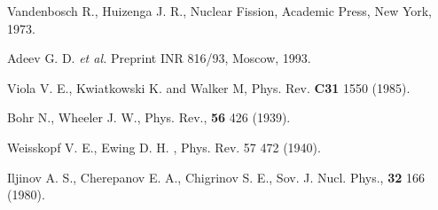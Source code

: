 \begin{thebibliography}{599}

 Vandenbosch R., Huizenga J. R., Nuclear Fission, Academic 
Press, New York, 1973.

 Adeev G. D. {\it et al.} Preprint INR 816/93, Moscow, 1993.

 Viola V. E., Kwiatkowski K. and Walker M, Phys. Rev. 
{\bf C31} 1550 (1985).

 Bohr N., Wheeler J. W., Phys. Rev., {\bf 56} 426 (1939).

 Weisskopf V. E., Ewing D. H. , Phys. Rev. {57} 472 (1940).

 Iljinov A. S., Cherepanov E. A., Chigrinov S. E.,
Sov. J. Nucl. Phys., {\bf 32} 166 (1980).

\end{thebibliography}
